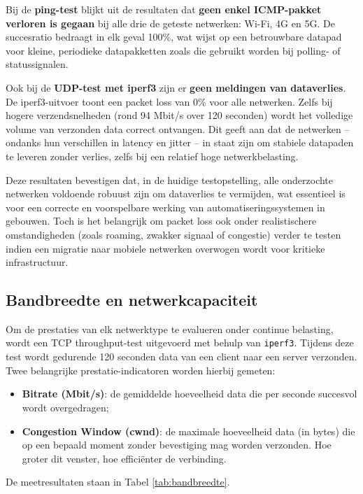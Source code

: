 Bij de \textbf{ping-test} blijkt uit de resultaten dat \textbf{geen enkel ICMP-pakket verloren is gegaan} bij alle drie de geteste netwerken: Wi-Fi, 4G en 5G. De succesratio bedraagt in elk geval 100\%, wat wijst op een betrouwbare datapad voor kleine, periodieke datapakketten zoals die gebruikt worden bij polling- of statussignalen.

Ook bij de \textbf{UDP-test met iperf3} zijn er \textbf{geen meldingen van dataverlies}. De iperf3-uitvoer toont een packet loss van 0\% voor alle netwerken. Zelfs bij hogere verzendsnelheden (rond 94 Mbit/s over 120 seconden) wordt het volledige volume van verzonden data correct ontvangen. Dit geeft aan dat de netwerken – ondanks hun verschillen in latency en jitter – in staat zijn om stabiele datapaden te leveren zonder verlies, zelfs bij een relatief hoge netwerkbelasting.

Deze resultaten bevestigen dat, in de huidige testopstelling, alle onderzochte netwerken voldoende robuust zijn om dataverlies te vermijden, wat essentieel is voor een correcte en voorspelbare werking van automatiseringssystemen in gebouwen. Toch is het belangrijk om packet loss ook onder realistischere omstandigheden (zoals roaming, zwakker signaal of congestie) verder te testen indien een migratie naar mobiele netwerken overwogen wordt voor kritieke infrastructuur.

\subsection{Bandbreedte en netwerkcapaciteit}
Om de prestaties van elk netwerktype te evalueren onder continue belasting, wordt een TCP throughput-test uitgevoerd met behulp van \texttt{iperf3}. Tijdens deze test wordt gedurende 120 seconden data van een client naar een server verzonden. Twee belangrijke prestatie-indicatoren worden hierbij gemeten:

\begin{itemize}
    \item \textbf{Bitrate (Mbit/s)}: de gemiddelde hoeveelheid data die per seconde succesvol wordt overgedragen;
    \item \textbf{Congestion Window (cwnd)}: de maximale hoeveelheid data (in bytes) die op een bepaald moment zonder bevestiging mag worden verzonden. Hoe groter dit venster, hoe efficiënter de verbinding.
\end{itemize}

De meetresultaten staan in Tabel \ref{tab:bandbreedte}.

